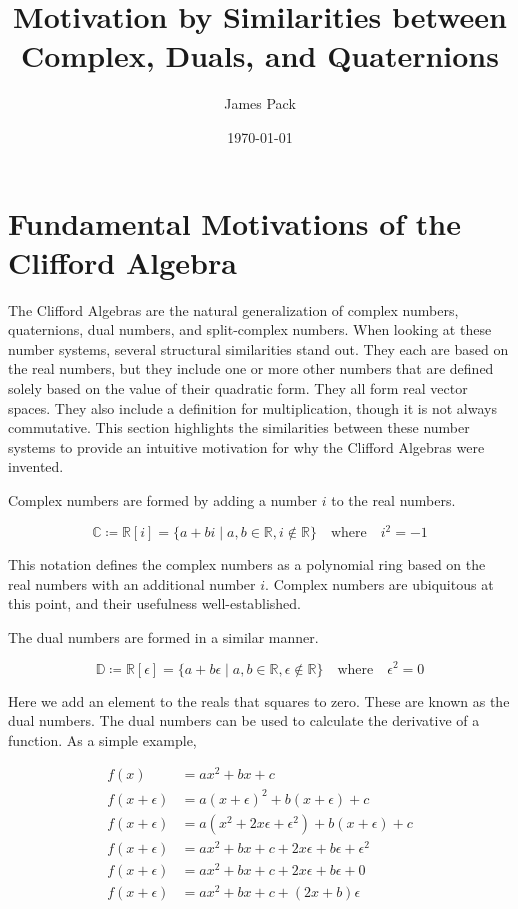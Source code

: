 \documentclass[8pt]{article}
\title{Motivation by Similarities between Complex, Duals, and Quaternions}
\author{James Pack}
\date{\today}
\begin{document}
\maketitle
\thispagestyle{fancy} %

\section{Fundamental Motivations of the Clifford Algebra}
The Clifford Algebras are the natural generalization of complex numbers, quaternions, dual numbers, and split-complex numbers. When looking at these number systems, several structural similarities stand out. They each are based on the real numbers, but they include one or more other numbers that are defined solely based on the value of their quadratic form. They all form real vector spaces. They also include a definition for multiplication, though it is not always commutative. This section highlights the similarities between these number systems to provide an intuitive motivation for why the Clifford Algebras were invented.

Complex numbers are formed by adding a number $i$ to the real numbers.

\[
  \mathbb{C} \coloneqq \mathbb{R}[i] = \{a + bi \mid a, b \in \mathbb{R}, i \notin \mathbb{R} \} \quad \text{where} \quad i^2 = -1
\]

This notation defines the complex numbers as a polynomial ring based on the real numbers with an additional number $i$. Complex numbers are ubiquitous at this point, and their usefulness well-established.

The dual numbers are formed in a similar manner.

\[
  \mathbb{D} \coloneqq \mathbb{R}[\epsilon] = \{a + b \epsilon \mid a, b \in \mathbb{R}, \epsilon \notin \mathbb{R} \} \quad \text{where} \quad \epsilon^2 = 0
\]

Here we add an element to the reals that squares to zero. These are known as the dual numbers. The dual numbers can be used to calculate the derivative of a function. As a simple example,

\begin{equation}
  \begin{aligned}
f(x) &= a x^2 + b x + c \\
f(x + \epsilon ) &= a (x + \epsilon )^2 + b(x + \epsilon ) + c \\
f(x + \epsilon ) &= a (x^2 + 2x \epsilon + \epsilon ^2) + b(x + \epsilon ) + c \\
f(x + \epsilon ) &= a x^2 + bx + c + 2x \epsilon + b \epsilon + \epsilon ^ 2 \\
f(x + \epsilon ) &= a x^2 + bx + c + 2x \epsilon + b \epsilon + 0 \\
f(x + \epsilon ) &= a x^2 + bx + c + (2x + b) \epsilon \\
\end{aligned}
\end{equation}
\end{document}
